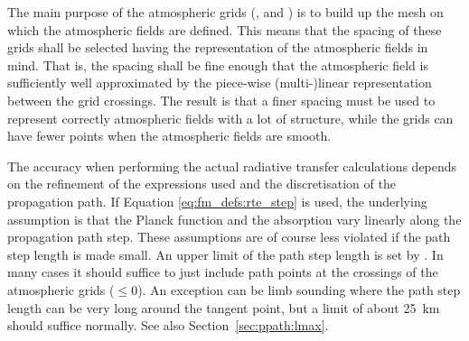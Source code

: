 The main purpose of the atmospheric grids (,
 and ) is to build up the
mesh on which the atmospheric fields are defined. This means that the
spacing of these grids shall be selected having the representation of
the atmospheric fields in mind. That is, the spacing shall be fine
enough that the atmospheric field is sufficiently well approximated by
the piece-wise (multi-)linear representation between the grid
crossings. The result is that a finer spacing must be used to
represent correctly atmospheric fields with a lot of structure, while
the grids can have fewer points when the atmospheric fields are
smooth. 

The accuracy when performing the actual radiative transfer calculations depends
on the refinement of the expressions used and the discretisation of the
propagation path. If Equation \ref{eq:fm_defs:rte_step} is used, the
underlying assumption is that the Planck function and the absorption vary
linearly along the propagation path step. These assumptions are of course less
violated if the path step length is made small. An upper limit of the path step
length is set by . In many cases it should suffice to
just include path points at the crossings of the atmospheric grids
($\leq0$). An exception can be limb sounding where the
path step length can be very long around the tangent point, but a limit of
about 25~km should suffice normally. See also Section~\ref{sec:ppath:lmax}.


